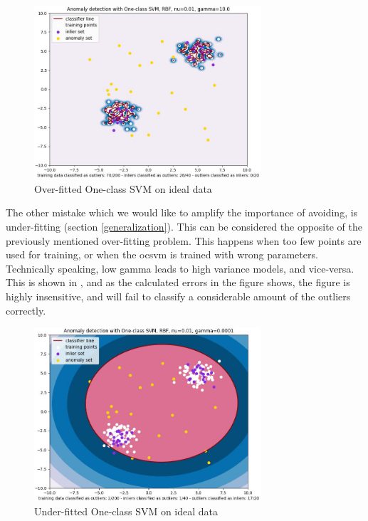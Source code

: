 \documentclass[english, a4paper]{report}
\begin{document}
{{{            \begin{figure}[H]
                \centering
                \includegraphics[width=0.75\textwidth]{anom-fake-overfitted}
                \caption{Over-fitted One-class SVM on ideal data}
                \label{fig:overfittedAD}
            \end{figure}
            
            The other mistake which we would like to amplify the importance of avoiding, is under-fitting (section \ref{generalization}). This can be considered the opposite of the previously mentioned over-fitting problem. This happens when too few points are used for training, or when the \gls{ocsvm} is trained with wrong parameters. Technically speaking, low gamma leads to high variance models, and vice-versa. This is shown in , and as the calculated errors in the figure shows, the figure is highly insensitive, and will fail to classify a considerable amount of the outliers correctly.
            
            \begin{figure}[H]
                \centering
                \includegraphics[width=0.75\textwidth]{anom-fake-underfitted}
                \caption{Under-fitted One-class SVM on ideal data}
                \label{fig:underfittedAD}
            \end{figure}
        
}}}
\end{document}
